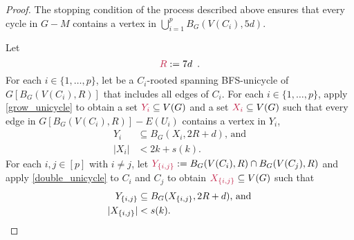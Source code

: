 \documentclass{patmorin}
\newcommand{\Oh}{\mathcal{O}}
\DeclarePairedDelimiter\set{\{}{\}}
\begin{document}
\begin{proof}
The stopping condition of the process described above ensures that 
every cycle in $G-M$ contains a vertex in $\bigcup_{i=1}^p B_G(V(C_i),5d)$.

Let
\[
\mathdefin{R}:=7d\enspace .
\]
For each $i\in\{1,\ldots,p\}$, 
let  be a $C_i$-rooted spanning BFS-unicycle of $G[B_G(V(C_i),R)]$ that includes all edges of $C_i$.
For each $i\in\{1,\ldots,p\}$, 
apply \cref{grow_unicycle} to obtain 
a set $\mathdefin{Y_i}\subseteq V(G)$ and 
a set $\mathdefin{X_i}\subseteq V(G)$ such that 
every edge in $G[B_G(V(C_i),R)]-E(U_i)$ contains a vertex in $Y_i$,
\begin{align}
    Y_i&\subseteq B_G(X_i,2R+d)\text{, and}\label{eq:Yi-contained-in-a-ball}\\
    |X_i|&<2k+s(k).\label{eq:Xi-size}
\end{align}
For each $i,j\in[p]$ with $i\neq j$, let $\mathdefin{Y_{\set{i,j}}}:=B_G(V(C_i),R)\cap B_G(V(C_j),R)$ and apply \cref{double_unicycle} to $C_i$ and $C_j$ to obtain $\mathdefin{X_{\set{i,j}}}\subseteq V(G)$ such that 
\begin{align}
Y_{\set{i,j}}&\subseteq B_G(X_{\set{i,j}},2R+d)\text{, and} \label{eq:Yij-in-a-ball}\\
|X_{\set{i,j}}|&< s(k).\label{eq:Xij-size}
\end{align}


\end{proof}
\end{document}
